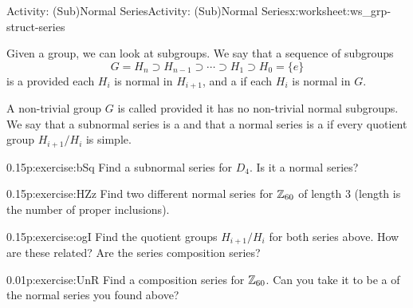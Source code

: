 \documentclass[11pt]{book}
\begin{document}
%
%
\typeout{************************************************}
\typeout{************************************************}
%
\begin{worksheet-subsection}{Activity: (Sub)Normal Series}{}{Activity: (Sub)Normal Series}{}{}{x:worksheet:ws_grp-struct-series}
\begin{introduction}{}%
Given a group, we can look at subgroups.  We say that a sequence of subgroups%
\begin{equation*}
G = H_n \supset H_{n-1} \supset \cdots \supset H_1 \supset H_0 = \{e\}
\end{equation*}
is a  provided each \(H_i\) is normal in \(H_{i+1}\), and a  if each \(H_i\) is normal in \(G\).%
\par
A non-trivial group \(G\) is called  provided it has no non-trivial normal subgroups.  We say that a subnormal series is a  and that a normal series is a  if every quotient group \(H_{i+1}/H_i\) is simple.%
\end{introduction}%
\begin{divisionexercise}{1}{}{0.15}{p:exercise:bSq}%
Find a subnormal series for \(D_4\). Is it a normal series?%
\end{divisionexercise}%
\begin{divisionexercise}{2}{}{0.15}{p:exercise:HZz}%
Find two different normal series for \(\mathbb{Z}_{60}\) of length 3 (length is the number of proper inclusions).%
\end{divisionexercise}%
\begin{divisionexercise}{3}{}{0.15}{p:exercise:ogI}%
Find the quotient groups \(H_{i+1}/H_i\) for both series above.  How are these related?  Are the series composition series?%
\end{divisionexercise}%
\begin{divisionexercise}{4}{}{0.01}{p:exercise:UnR}%
Find a composition series for \(\mathbb{Z}_{60}\).  Can you take it to be a  of the normal series you found above?%
\end{divisionexercise}%
\end{worksheet-subsection}
\restoregeometry
\end{document}
